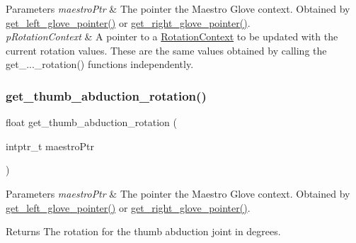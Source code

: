 \begin{DoxyParams}{Parameters}
{\em maestro\+Ptr} & The pointer the Maestro Glove context. Obtained by \hyperlink{group__glove_management_ga63ce3c99d4a8b8db851b22af9185764e}{get\+\_\+left\+\_\+glove\+\_\+pointer()} or \hyperlink{group__glove_management_ga9b8fd9d91aeac3f8da50f7a7eba0c32b}{get\+\_\+right\+\_\+glove\+\_\+pointer()}. \\
\hline
{\em p\+Rotation\+Context} & A pointer to a {\ttfamily \hyperlink{struct_rotation_context}{Rotation\+Context}} to be updated with the current rotation values. These are the same values obtained by calling the {\ttfamily get\+\_\+...\+\_\+rotation()} functions independently. \\
\hline
\end{DoxyParams}
\mbox{\label{group__rotation_access_ga2dddb1473cdf463238904595e309938f}} 
\subsubsection{\texorpdfstring{get\+\_\+thumb\+\_\+abduction\+\_\+rotation()}{get\_thumb\_abduction\_rotation()}}
{\footnotesize\ttfamily float get\+\_\+thumb\+\_\+abduction\+\_\+rotation (\begin{DoxyParamCaption}\item[{intptr\+\_\+t}]{maestro\+Ptr }\end{DoxyParamCaption})}


\begin{DoxyParams}{Parameters}
{\em maestro\+Ptr} & The pointer the Maestro Glove context. Obtained by \hyperlink{group__glove_management_ga63ce3c99d4a8b8db851b22af9185764e}{get\+\_\+left\+\_\+glove\+\_\+pointer()} or \hyperlink{group__glove_management_ga9b8fd9d91aeac3f8da50f7a7eba0c32b}{get\+\_\+right\+\_\+glove\+\_\+pointer()}. \\
\hline
\end{DoxyParams}
\begin{DoxyReturn}{Returns}
The rotation for the thumb abduction joint in degrees. 
\end{DoxyReturn}
\mbox{\label{group__rotation_access_gafc4acff90b0a11899e18ab2212ec6ce2}} 
